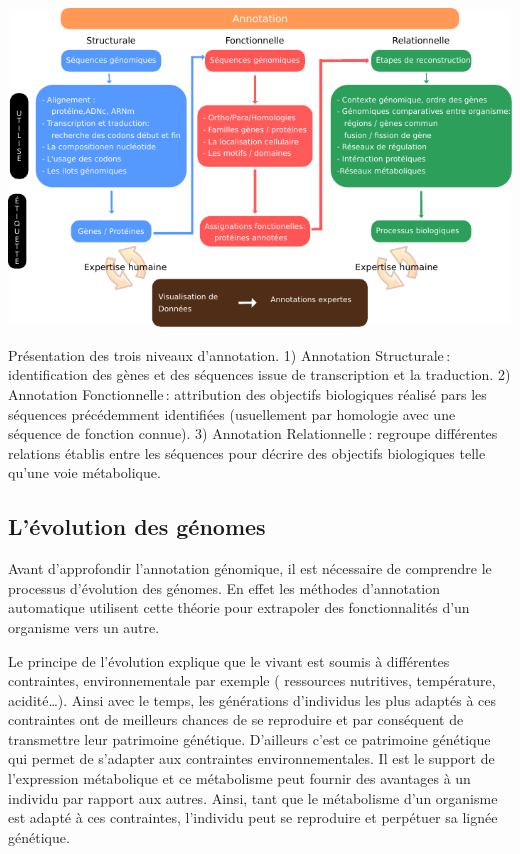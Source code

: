\begin{refsegment}
    
    \begin{shadedfigure}[H]
        \centering
        \includegraphics[width=\textwidth]{img/niveaux_annotations.pdf}
        \caption{Présentation des trois niveaux d’annotation. 1) Annotation Structurale : identification des gènes et des séquences issue de transcription et la traduction. 2) Annotation Fonctionnelle : attribution des objectifs biologiques réalisé pars les séquences précédemment identifiées (usuellement par homologie avec une séquence de fonction connue). 3) Annotation Relationnelle : regroupe différentes relations établis entre les séquences pour décrire des objectifs biologiques telle qu'une voie métabolique.  }
        \label{fig:niveaux_annotation}
    \end{shadedfigure}
    
    \subsection{L’évolution des génomes}
    Avant d'approfondir l’annotation génomique, il est nécessaire de comprendre le processus d’évolution des génomes. En effet les méthodes d’annotation automatique utilisent cette théorie pour extrapoler des fonctionnalités d’un organisme vers un autre.
    
    Le principe de l'évolution explique que le vivant est soumis à différentes contraintes, environnementale par exemple ( ressources nutritives, température, acidité\ldots ). Ainsi avec le temps, les générations d’individus les plus adaptés à ces contraintes ont de meilleurs chances de se reproduire et par conséquent de transmettre leur patrimoine génétique. D’ailleurs c’est ce patrimoine génétique qui permet de s’adapter aux contraintes environnementales. Il est le support de l’expression métabolique et ce métabolisme peut fournir des avantages à un individu par rapport aux autres. Ainsi, tant que le métabolisme d’un organisme est adapté à ces contraintes, l’individu peut se reproduire et perpétuer sa lignée génétique.
    

\end{refsegment}
